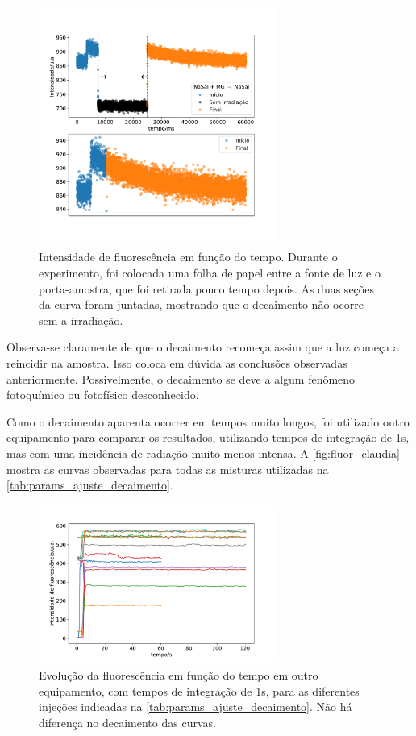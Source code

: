 	\begin{figure}[h]
		\centering
		\includegraphics[width=0.7\textwidth]{imagens/fluor/buraco}
		\caption{Intensidade de fluorescência em função do tempo. Durante o experimento, foi colocada uma folha de papel entre a fonte de luz e o porta-amostra, que foi retirada pouco tempo depois. As duas seções da curva foram juntadas, mostrando que o decaimento não ocorre sem a irradiação.}
		\label{fig:fluorescencia_buraco}
	\end{figure}
	
	Observa-se claramente de que o decaimento recomeça assim que a luz começa a reincidir na amostra. Isso coloca em dúvida as conclusões observadas anteriormente. Possivelmente, o decaimento se deve a algum fenômeno fotoquímico ou fotofísico desconhecido.
	
	Como o decaimento aparenta ocorrer em tempos muito longos, foi utilizado outro equipamento para comparar os resultados, utilizando tempos de integração de 1s, mas com uma incidência de radiação muito menos intensa. A \autoref{fig:fluor_claudia} mostra as curvas observadas para todas as misturas utilizadas na  \autoref{tab:params_ajuste_decaimento}.
	
	\begin{figure}[h]
		\centering
		\includegraphics[width=0.7\textwidth]{imagens/fluor/exp_claudia}
		\caption{Evolução da fluorescência em função do tempo em outro equipamento, com tempos de integração de 1s, para as diferentes injeções indicadas na  \autoref{tab:params_ajuste_decaimento}. Não há diferença no decaimento das curvas.}
		\label{fig:fluor_claudia}
	\end{figure}
	
